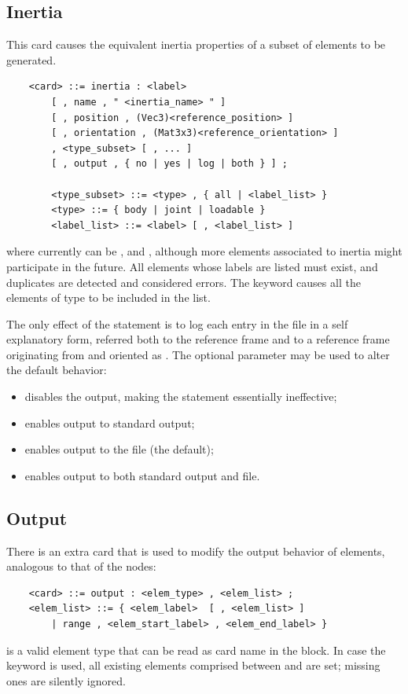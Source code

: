 \subsection{Inertia}\label{sec:EL:MISC:INERTIA}
This card causes the equivalent inertia properties of a subset
of elements to be generated.
\begin{verbatim}
    <card> ::= inertia : <label>
        [ , name , " <inertia_name> " ]
        [ , position , (Vec3)<reference_position> ]
        [ , orientation , (Mat3x3)<reference_orientation> ]
        , <type_subset> [ , ... ]
        [ , output , { no | yes | log | both } ] ;

        <type_subset> ::= <type> , { all | <label_list> }
        <type> ::= { body | joint | loadable }
        <label_list> ::= <label> [ , <label_list> ]
\end{verbatim}
where  currently can be ,  and , 
although more elements associated to inertia might participate in the future.
All elements whose labels are listed must exist, and duplicates
are detected and considered errors.
The keyword  causes all the elements of type  
to be included in the list.

\noindent
The only effect of the  statement is to log
each  entry in the  file in a self explanatory form,
referred both to the  reference frame and to a reference frame
originating from  and oriented 
as .
The optional parameter  may be used to alter the default 
behavior:
\begin{itemize}
\item {} disables the output, making the  
statement essentially ineffective;
\item {} enables output to standard output;
\item {} enables output to the  file (the default);
\item {} enables output to both standard output and  file.
\end{itemize}



\subsection{Output}
There is an extra card that is used to modify the output behavior of 
elements, analogous to that of the nodes:
\begin{verbatim}
    <card> ::= output : <elem_type> , <elem_list> ;
    <elem_list> ::= { <elem_label>  [ , <elem_list> ]
        | range , <elem_start_label> , <elem_end_label> }
\end{verbatim}
 is a valid element type that can be read 
as card name in the  block.
In case the keyword  is used, all existing elements comprised
between  and 
are set; missing ones are silently ignored.





